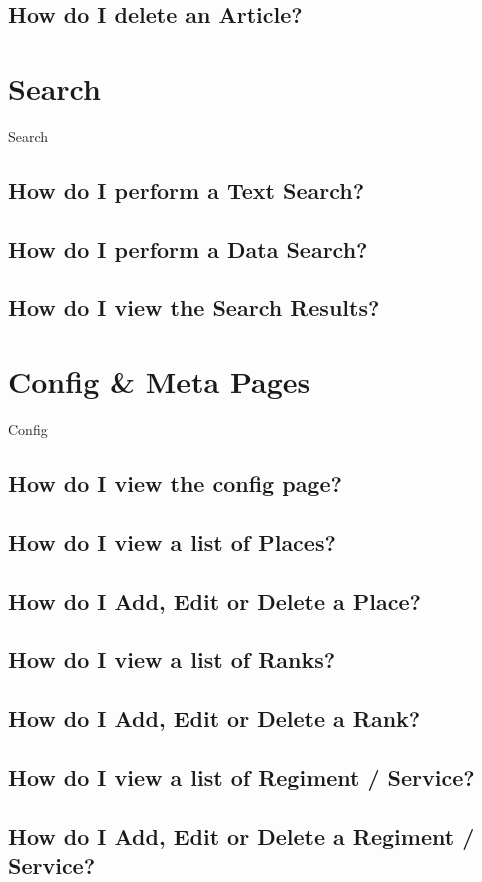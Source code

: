 \documentclass[12pt]{article}
\begin{document}
\subsection{How do I delete an Article?}

\section{Search}\label{sec:search}
Search
\subsection{How do I perform a Text Search?}
\subsection{How do I perform a Data Search?}
\subsection{How do I view the Search Results?}

\section{Config \& Meta Pages}\label{sec:config}
Config
\subsection{How do I view the config page?}\label{ssec:config}
\subsection{How do I view a list of Places?}
\subsection{How do I Add, Edit or Delete a Place?}
\subsection{How do I view a list of Ranks?}
\subsection{How do I Add, Edit or Delete a Rank?}
\subsection{How do I view a list of Regiment / Service?}
\subsection{How do I Add, Edit or Delete a Regiment / Service?}
\end{document}
